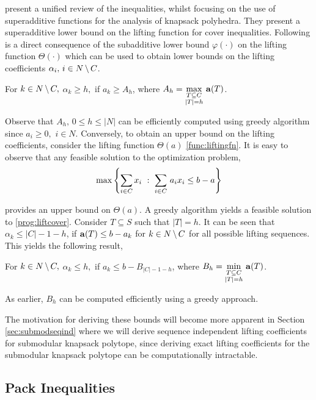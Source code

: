 \documentclass[10pt,twoside]{amsart}
\begin{document}
\atam \cite{Atamturk2005} present a unified review of the inequalities, whilst focusing on the use of superadditive functions for the analysis of knapsack polyhedra. They present a superadditive lower bound on the lifting function for cover inequalities. Following is a direct consequence of the subadditive lower bound $\varphi(\cdot)$ on the lifting function $\Theta(\cdot)$ which can be used to obtain lower bounds on the lifting coefficients $\alpha_i,\,i\in N\,\backslash\, C$.

\begin{prop}
\label{prop:seqindlowbound}
  For $k\in N\,\backslash\, C,$ $\alpha_k \geq h,$ if $a_k \geq A_h$, where $A_h = \underset{\substack{T\subseteq C\\|T| = h}}{\max}\,\, \mathbf{a}(T)$.
\end{prop}

Observe that $A_h,\,0\leq h \leq |N|$ can be efficiently computed using greedy algorithm since $a_i \geq 0,\, \, i \in N$. Conversely, to obtain an upper bound on the lifting coefficients, consider the lifting function $\Theta(a)$ \eqref{func:liftingfn}. It is easy to observe that any feasible solution to the optimization problem,
\begin{align}
  \max\left\{ {\sum_{i\in C} x_i} \ : \ {\sum_{i\in C}\, a_ix_i \leq b - a} \right\} \label{prog:liftcover}
\end{align}

provides an upper bound on $\Theta(a)$. A greedy algorithm yields a feasible solution to \eqref{prog:liftcover}. Consider $T \subseteq S$ such that $|T| = h$. It can be seen that $\alpha_k \leq |C| - 1 - h$, if $\mathbf{a}(T) \leq b - a_k$ for $k \in N\,\backslash\, C$ for all possible lifting sequences. This yields the following result,
\begin{prop}
\label{prop:seqindupbound}
  For $k\in N\,\backslash\, C,$ $\alpha_k \leq h,$ if $a_k \leq b - B_{|C|-1-h}$, where $B_h = \underset{\substack{T\subseteq C\\|T| = h}}{\min}\,\, \mathbf{a}(T)$.
\end{prop}
As earlier, $B_h$ can be computed efficiently using a greedy approach.

The motivation for deriving these bounds will become more apparent in Section \ref{sec:submodseqind} where we will derive sequence independent lifting coefficients for submodular knapsack polytope, since deriving exact lifting coefficients for the submodular knapsack polytope can be computationally intractable.
\subsection{Pack Inequalities}\hfill
\end{document}
